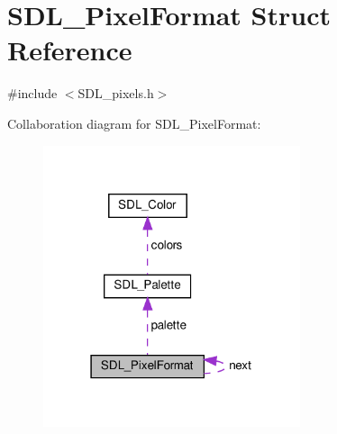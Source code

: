 \hypertarget{structSDL__PixelFormat}{}\section{S\+D\+L\+\_\+\+Pixel\+Format Struct Reference}
\label{structSDL__PixelFormat}


{\ttfamily \#include $<$S\+D\+L\+\_\+pixels.\+h$>$}



Collaboration diagram for S\+D\+L\+\_\+\+Pixel\+Format\+:\nopagebreak
\begin{figure}[H]
\begin{center}
\leavevmode
\includegraphics[width=214pt]{structSDL__PixelFormat__coll__graph}
\end{center}
\end{figure}
